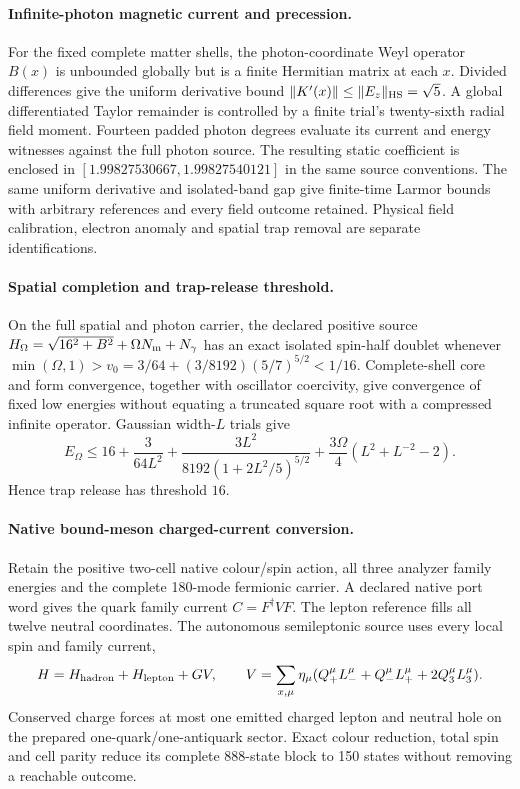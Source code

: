 \paragraph{Infinite-photon magnetic current and precession.}
For the fixed complete matter shells, the photon-coordinate Weyl operator
$B(x)$ is unbounded globally but is a finite Hermitian matrix at each $x$.
Divided differences give the uniform derivative bound
$\|K'(x)\|\leq\|E_z\|_{\rm HS}=\sqrt5$. A global differentiated Taylor
remainder is controlled by a finite trial's twenty-sixth radial field
moment. Fourteen padded photon degrees evaluate its current and energy
witnesses against the full photon source. The resulting static coefficient
is enclosed in $[1.99827530667,1.99827540121]$ in the same source
conventions. The same uniform derivative and isolated-band gap give
finite-time Larmor bounds with arbitrary references and every field outcome
retained. Physical field calibration, electron anomaly and spatial trap
removal are separate identifications.


\paragraph{Spatial completion and trap-release threshold.}
On the full spatial and photon carrier, the declared positive source
$H_\Omega=\sqrt{16^2+B^2}+\Omega N_{\rm m}+N_\gamma$ has an exact isolated
spin-half doublet whenever
$\min(\Omega,1)>v_0=3/64+(3/8192)(5/7)^{5/2}<1/16$.
Complete-shell core and form convergence, together with oscillator
coercivity, give convergence of fixed low energies without equating a
truncated square root with a compressed infinite operator.
Gaussian width-$L$ trials give
\[
E_\Omega\leq16+\frac3{64L^2}
 +\frac{3L^2}{8192(1+2L^2/5)^{5/2}}
 +\frac{3\Omega}{4}(L^2+L^{-2}-2).
\]
Hence trap release has threshold $16$.


\paragraph{Native bound-meson charged-current conversion.}
Retain the positive two-cell native colour/spin action, all three analyzer
family energies and the complete 180-mode fermionic carrier. A declared
native port word gives the quark family current $C=F^\dagger VF$.
The lepton reference fills all twelve neutral coordinates. The autonomous
semileptonic source uses every local spin and family current,
\[
 H=H_{\rm hadron}+H_{\rm lepton}+GV,\qquad
 V=\sum_{x,\mu}\eta_\mu
 (Q_+^\mu L_-^\mu+Q_-^\mu L_+^\mu+2Q_3^\mu L_3^\mu).
\]
Conserved charge forces at most one emitted charged lepton and neutral hole
on the prepared one-quark/one-antiquark sector. Exact colour reduction,
total spin and cell parity reduce its complete 888-state block to 150
states without removing a reachable outcome.

